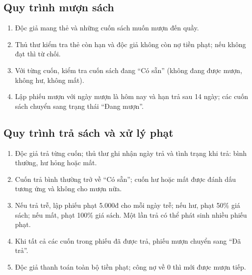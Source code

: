 \documentclass[13pt,a4paper,oneside]{extreport}
\begin{document}
\subsection{Quy trình mượn sách}
\begin{enumerate}
\item Độc giả mang thẻ và những cuốn sách muốn mượn đến quầy.
\item Thủ thư kiểm tra thẻ còn hạn và độc giả không còn nợ tiền phạt; nếu không đạt thì từ chối.
\item Với từng cuốn, kiểm tra cuốn sách đang ``Có sẵn'' (không đang được mượn, không hư, không mất).
\item Lập phiếu mượn với ngày mượn là hôm nay và hạn trả sau 14 ngày; các cuốn sách chuyển sang trạng thái ``Đang mượn''.
\end{enumerate}
\subsection{Quy trình trả sách và xử lý phạt}
\begin{enumerate}
\item Độc giả trả từng cuốn; thủ thư ghi nhận ngày trả và tình trạng khi trả: bình thường, hư hỏng hoặc mất.
\item Cuốn trả bình thường trở về ``Có sẵn''; cuốn hư hoặc mất được đánh dấu tương ứng và không cho mượn nữa.
\item Nếu trả trễ, lập phiếu phạt 5.000đ cho mỗi ngày trễ; nếu hư, phạt 50\% giá sách; nếu mất, phạt 100\% giá sách. Một lần trả có thể phát sinh nhiều phiếu phạt.
\item Khi tất cả các cuốn trong phiếu đã được trả, phiếu mượn chuyển sang ``Đã trả''.
\item Độc giả thanh toán toàn bộ tiền phạt; công nợ về 0 thì mới được mượn tiếp.
\end{enumerate}
\end{document}
